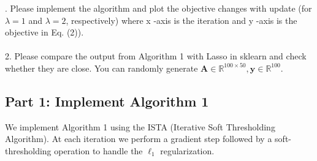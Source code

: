 \documentclass[11pt]{article}
\begin{document}
. Please implement the algorithm and plot the objective changes with update (for $\lambda=1$ and $\lambda=2$, respectively) where x -axis is the iteration and y -axis is the objective in Eq. (2)). \\\\
2. Please compare the output from Algorithm 1 with Lasso in sklearn and check whether they are close. You can randomly generate $\mathbf{A} \in \mathbb{R}^{100 \times 50}, \mathbf{y} \in \mathbb{R}^{100}$.

\subsection*{Part 1: Implement Algorithm 1}

We implement Algorithm 1 using the ISTA (Iterative Soft Thresholding Algorithm).
At each iteration we perform a gradient step followed by a soft-thresholding
operation to handle the $\ell_1$ regularization.
\end{document}
